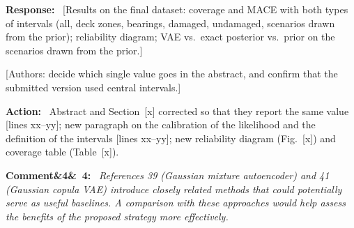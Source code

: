 \documentclass[11pt]{article}
\newenvironment{rcomment}[1]{\par\bigskip\noindent\textbf{Comment\ifx&#1&\else\ #1\fi:}\ \itshape}{\par}
\newenvironment{response}{\par\smallskip\noindent\color{resp}\textbf{Response:}\ }{\par}
\newenvironment{action}{\par\smallskip\noindent\color{resp}\textbf{Action:}\ }{\par}
\newcommand{\authornote}[1]{\textcolor{note}{\textsf{[Authors: #1]}}}
\newcommand{\tbd}[1]{\textcolor{note}{\textsf{[#1]}}}
\newcommand{\lines}[1]{\tbd{lines #1}}
\begin{document}
\begin{response}
\tbd{Results on the final dataset: coverage and MACE with both types of intervals (all, deck zones, bearings, damaged, undamaged,
scenarios drawn from the prior); reliability diagram; VAE vs.\ exact posterior vs.\ prior on the scenarios drawn from the prior.}
\end{response}
\authornote{decide which single value goes in the abstract, and confirm that the submitted version used central intervals.}

\begin{action}
Abstract and Section~\tbd{x} corrected so that they report the same value \lines{xx--yy}; new paragraph on the
calibration of the likelihood and the definition of the intervals \lines{xx--yy}; new reliability diagram (Fig.~\tbd{x})
and coverage table (Table~\tbd{x}).
\end{action}

\begin{rcomment}{4}
References 39 (Gaussian mixture autoencoder) and 41 (Gaussian copula VAE) introduce closely related methods that could
potentially serve as useful baselines. A comparison with these approaches would help assess the benefits of the proposed
strategy more effectively.
\end{rcomment}
\end{document}
